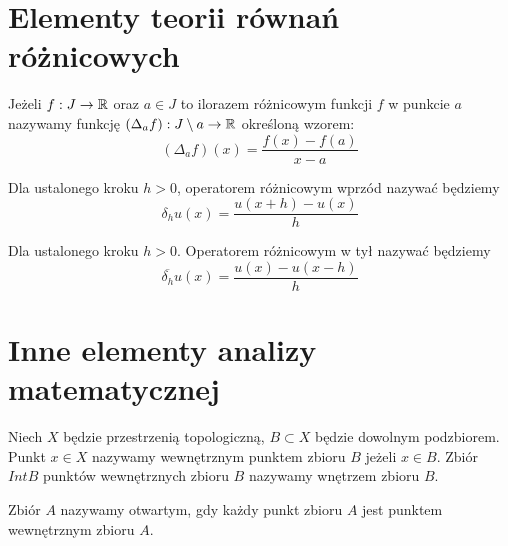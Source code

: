 \documentclass[12pt,a4paper]{report}
\begin{document}
\section{Elementy teorii równań różnicowych}
 
\begin{definition}
Jeżeli $ f: J \to \mathbb{R} $ oraz $ a \in J$ to ilorazem różnicowym funkcji $f$ w punkcie $a$ nazywamy funkcję $ (\Delta_{a}f) : J \setminus a \to \mathbb{R} $ określoną wzorem: 
$$
(\Delta_{a}f)(x) = \frac{f(x) - f(a)}{x-a}
$$
\end{definition}
\begin{definition}\label{operator_wporzd}
Dla ustalonego kroku $h>0 $, operatorem różnicowym wprzód nazywać będziemy 
$$
\delta_h u(x) = \frac{u(x+h) - u(x)}{h}
$$
\end{definition}

\begin{definition}\label{operator_wtyl}
Dla ustalonego kroku $h>0$. Operatorem różnicowym w tył nazywać będziemy 
$$
\overline{\delta_h} u(x) = \frac{u(x)-u(x-h)}{h} 
$$
\end{definition}


\section{Inne elementy analizy matematycznej}

\begin{definition}
Niech $X$ będzie przestrzenią topologiczną, $B \subset X $ będzie dowolnym podzbiorem. Punkt $x \in X$ nazywamy wewnętrznym punktem zbioru $B$ jeżeli $x \in B$. Zbiór $IntB$ punktów wewnętrznych zbioru $B$ nazywamy wnętrzem zbioru $B$. 
\end{definition}
\begin{definition} 
Zbiór $A$ nazywamy otwartym, gdy każdy punkt zbioru $A$ jest punktem wewnętrznym zbioru $A$. 
\end{definition}
\end{document}
